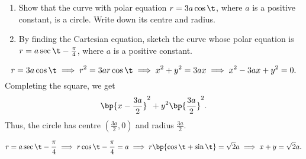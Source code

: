 \clearpage
\begin{problem}
    \begin{enumerate}
        \item Show that the curve with polar equation $r = 3a\cos\t$, where $a$ is a positive constant, is a circle. Write down its centre and radius.
        \item By finding the Cartesian equation, sketch the curve whose polar equation is $r = a\sec{\t - \frac\pi4}$, where $a$ is a positive constant.
    \end{enumerate}
\end{problem}
\begin{solution}
    \begin{ppart}
        \[r = 3a\cos\t \implies r^2 = 3a r\cos\t \implies x^2 + y^2 = 3ax \implies x^2 - 3ax + y^2 = 0.\] Completing the square, we get \[\bp{x - \frac{3a}2}^2 + y^2  \bp{\frac{3a}{2}}^2.\] Thus, the circle has centre $(\frac{3a}2, 0)$ and radius $\frac{3a}{2}$.
    \end{ppart}
    \begin{ppart}
        \[r = a\sec{\t - \frac\pi4} \implies r\cos{\t - \frac\pi4} = a \implies r\bp{\cos\t + \sin\t} = \sqrt2 a \implies x + y = \sqrt2 a.\]

        \begin{center}
        \end{center}
    \end{ppart}
\end{solution}

